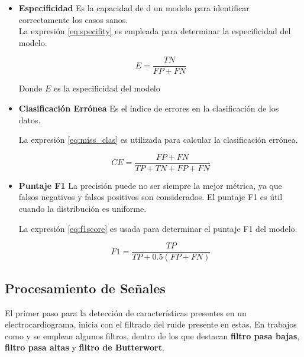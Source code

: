 \begin{itemize}
        \item \textbf{Especificidad}
        Es la capacidad de d un modelo para identificar correctamente los casos sanos.\\

         La expresión \ref{eq:specifity} es empleada para determinar la especificidad del modelo.

         \begin{equation}
            E = \frac{TN}{FP + FN}
            \label{eq:specifity}
         \end{equation}

         Donde
         \noindent
         $E$ es la especificidad del modelo

         \item \textbf{Clasificación Errónea}
        Es el indice de errores en la clasificación de los datos.

        La expresión \ref{eq:miss_clas} es utilizada para calcular la clasificación errónea.

        \begin{equation}
            CE = \frac{FP + FN}{TP + TN + FP + FN}
            \label{eq:miss_clas}
        \end{equation}

        \item \textbf{Puntaje F1}
        La precisión puede no ser siempre la mejor métrica, ya que falsos negativos y falsos positivos son considerados. El puntaje F1 es útil cuando la distribución es uniforme.

        La expresión \ref{eq:f1score} es usada para determinar el puntaje F1 del modelo.

    \begin{equation}
        F1 = \frac{TP}{TP + 0.5(FP + FN)}
        \label{eq:f1score}
    \end{equation}

    \end{itemize}

    \subsection{Procesamiento de Señales}
    El primer paso para la detección de características presentes en un electrocardiograma, inicia con el filtrado del ruide presente en estas. En trabajos como \citep[3]{bib10} y \citep[p. 366]{bib11} se emplean algunos filtros, dentro de los que destacan \textbf{filtro pasa bajas}, \textbf{filtro pasa altas} y \textbf{filtro de Butterwort}. 

